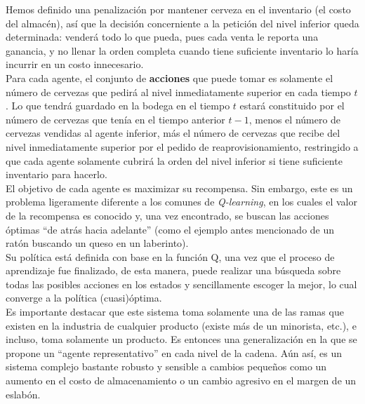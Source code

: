 Hemos definido una penalizaci\'on por mantener cerveza en el inventario (el costo del almac\'en), as\'i que la decisi\'on concerniente a la petici\'on del nivel inferior queda determinada: vender\'a todo lo que pueda, pues cada venta le reporta una ganancia, y no llenar la orden completa cuando tiene suficiente inventario lo har\'ia incurrir en un costo innecesario.\\

Para cada agente, el conjunto de \textbf{acciones} que puede tomar es solamente el n\'umero de cervezas que pedir\'a al nivel inmediatamente superior en cada tiempo $t$. Lo que tendr\'a guardado en la bodega en el tiempo $t$ estar\'a constituido por el n\'umero de cervezas que ten\'ia en el tiempo anterior $t-1$, menos el n\'umero de cervezas vendidas al agente inferior, m\'as el n\'umero de cervezas que recibe del nivel inmediatamente superior por el pedido de reaprovisionamiento, restringido a que cada agente solamente cubrir\'a la orden del nivel inferior si tiene suficiente inventario para hacerlo.\\

El objetivo de cada agente es maximizar su recompensa. Sin embargo, este es un problema ligeramente diferente a los comunes de \textit{Q-learning}, en los cuales el valor de la recompensa es conocido y, una vez encontrado, se buscan las acciones \'optimas ``de atr\'as hacia adelante'' (como el ejemplo antes mencionado de un rat\'on buscando un queso en un laberinto).\\

Su pol\'itica est\'a definida con base en la funci\'on Q, una vez que el proceso de aprendizaje fue finalizado, de esta manera, puede realizar una b\'usqueda sobre todas las posibles acciones en los estados y sencillamente escoger la mejor, lo cual converge a la pol\'itica (cuasi)\'optima. \\

Es importante destacar que este sistema toma solamente una de las ramas que existen en la industria de cualquier producto (existe m\'as de un minorista, etc.), e incluso, toma solamente un producto. Es entonces una generalizaci\'on en la que se propone un ``agente representativo'' en cada nivel de la cadena. A\'un as\'i, es un sistema complejo bastante robusto y sensible a cambios peque\~nos como un aumento en el costo de almacenamiento o un cambio agresivo en el margen de un eslab\'on.


